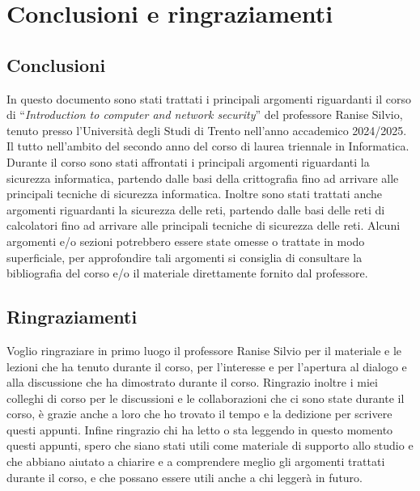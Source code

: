 \chapter*{Conclusioni e ringraziamenti}
\thispagestyle{chapterInit}

\section*{Conclusioni}
    In questo documento sono stati trattati i principali argomenti riguardanti il corso di ``\textit{Introduction to computer and network security}'' del professore Ranise Silvio, tenuto presso l'Università degli Studi di Trento nell'anno accademico 2024/2025. Il tutto nell'ambito del secondo anno del corso di laurea triennale in Informatica.
    Durante il corso sono stati affrontati i principali argomenti riguardanti la sicurezza informatica, partendo dalle basi della crittografia fino ad arrivare alle principali tecniche di sicurezza informatica. Inoltre sono stati trattati anche argomenti riguardanti la sicurezza delle reti, partendo dalle basi delle reti di calcolatori fino ad arrivare alle principali tecniche di sicurezza delle reti.\newline 
    Alcuni argomenti e/o sezioni potrebbero essere state omesse o trattate in modo superficiale, per approfondire tali argomenti si consiglia di consultare la bibliografia del corso e/o il materiale direttamente fornito dal professore.

\section*{Ringraziamenti}
    Voglio ringraziare in primo luogo il professore Ranise Silvio per il materiale e le lezioni che ha tenuto durante il corso, per l'interesse e per l'apertura al dialogo e alla discussione che ha dimostrato durante il corso.\newline
    Ringrazio inoltre i miei colleghi di corso per le discussioni e le collaborazioni che ci sono state durante il corso, è grazie anche a loro che ho trovato il tempo e la dedizione per scrivere questi appunti.\newline
    Infine ringrazio chi ha letto o sta leggendo in questo momento questi appunti, spero che siano stati utili come materiale di supporto allo studio e che abbiano aiutato a chiarire e a comprendere meglio gli argomenti trattati durante il corso, e che possano essere utili anche a chi leggerà in futuro.

